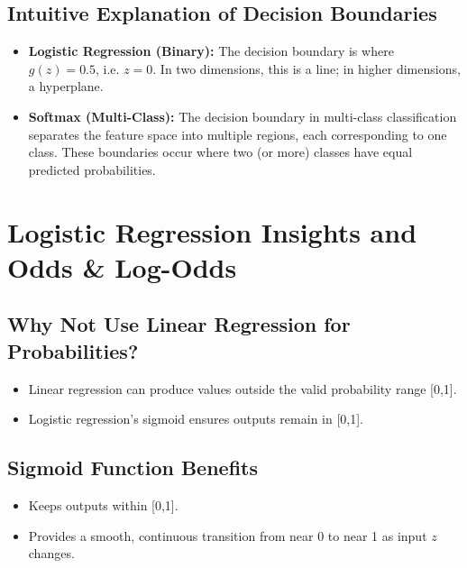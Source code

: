 \documentclass[10pt]{article}
\begin{document}
\subsection{Intuitive Explanation of Decision Boundaries}
\begin{itemize}
    \item \textbf{Logistic Regression (Binary):} The decision boundary is where \(g(z)=0.5\), i.e. \(z=0\). In two dimensions, this is a line; in higher dimensions, a hyperplane.
    \item \textbf{Softmax (Multi-Class):} The decision boundary in multi-class classification separates the feature space into multiple regions, each corresponding to one class. These boundaries occur where two (or more) classes have equal predicted probabilities.
\end{itemize}

\section{Logistic Regression Insights and Odds \& Log-Odds}

\subsection{Why Not Use Linear Regression for Probabilities?}
\begin{itemize}
    \item Linear regression can produce values outside the valid probability range [0,1].
    \item Logistic regression’s sigmoid ensures outputs remain in [0,1].
\end{itemize}

\subsection{Sigmoid Function Benefits}
\begin{itemize}
    \item Keeps outputs within [0,1].
    \item Provides a smooth, continuous transition from near 0 to near 1 as input \(z\) changes.
\end{itemize}
\end{document}
